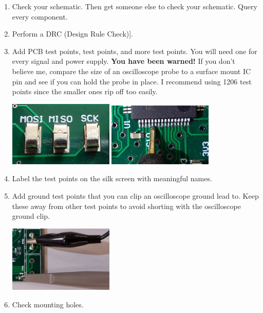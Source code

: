 \begin{enumerate}
\item Check your schematic.  Then get someone else to check your
  schematic.  Query every component.

\item Perform a DRC (Design Rule Check)].

\item Add PCB test points, test points, and more test points.  You
  will need one for every signal and power supply.  \textbf{You have
    been warned!}  If you don't believe me, compare the size of an
  oscilloscope probe to a surface mount IC pin and see if you can hold
  the probe in place.  I recommend using 1206 test points since the
  smaller ones rip off too easily.

  \includegraphics[width=5cm]{../guide/figs/testpoints.jpg}  \includegraphics[width=5cm]{../guide/figs/micro_probe_zoom.jpg}

\item Label the test points on the silk screen with meaningful names.

\item Add ground test points that you can clip an oscilloscope ground
  lead to.  Keep these away from other test points to avoid shorting
  with the oscilloscope ground clip.

\includegraphics[width=5cm]{figs/scope_probe_testpoints.jpg}

\item Check mounting holes.


\end{enumerate}
